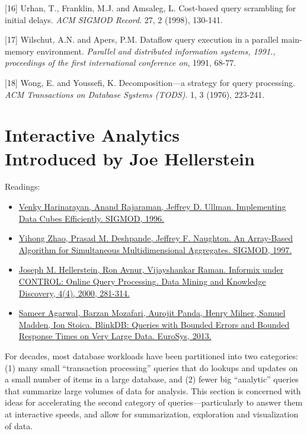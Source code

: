 \documentclass[b5paper,11pt,twoside,openright]{book}
\newcommand\Chapter[3]{
  \hypertarget{#1}{
    \chapter[#2]{#2\\{\Large #3}}
  }
}
\begin{document}
\leavevmode\hypertarget{ref-urhan1998cost}{}%
{[}16{]} Urhan, T., Franklin, M.J. and Amsaleg, L. Cost-based query
scrambling for initial delays. \emph{ACM SIGMOD Record}. 27, 2 (1998),
130-141.

\leavevmode\hypertarget{ref-wilschut1991dataflow}{}%
{[}17{]} Wilschut, A.N. and Apers, P.M. Dataflow query execution in a
parallel main-memory environment. \emph{Parallel and distributed
  information systems, 1991., proceedings of the first international
  conference on}, 1991, 68-77.

\leavevmode\hypertarget{ref-wong1976decomposition}{}%
{[}18{]} Wong, E. and Youssefi, K. Decomposition---a strategy for query
processing. \emph{ACM Transactions on Database Systems (TODS)}. 1, 3
(1976), 223-241.


\Chapter{ch8-interactive}{%
Interactive Analytics
}{%
Introduced by Joe Hellerstein
}

\begin{framed}
Readings:
\begin{itemize}
\item
\href{https://scholar.google.com/scholar?cluster=9112921129698038148}{Venky
  Harinarayan, Anand Rajaraman, Jeffrey D. Ullman. {Implementing Data
    Cubes Efficiently}. {SIGMOD}, 1996.}
\item
\href{https://scholar.google.com/scholar?cluster=1761772586638103323}{Yihong
  Zhao, Prasad M. Deshpande, Jeffrey F. Naughton. {An Array-Based
    Algorithm for Simultaneous Multidimensional Aggregates}. {SIGMOD},
  1997.}
\item
\href{https://scholar.google.com/scholar?cluster=1434575511619007556}{Joseph
  M. Hellerstein, Ron Avnur, Vijayshankar Raman. {Informix under CONTROL:
    Online Query Processing}. {Data Mining and Knowledge Discovery}, 4(4),
  2000, 281-314.}
\item
\href{https://scholar.google.com/scholar?cluster=4916926405792203059}{Sameer
  Agarwal, Barzan Mozafari, Aurojit Panda, Henry Milner, Samuel Madden,
  Ion Stoica. {BlinkDB: Queries with Bounded Errors and Bounded Response
    Times on Very Large Data}. {EuroSys}, 2013.}
\end{itemize}
\end{framed}

For decades, most database workloads have been partitioned into two
categories: (1) many small ``transaction processing'' queries that do
lookups and updates on a small number of items in a large database, and
(2) fewer big ``analytic'' queries that summarize large volumes of data
for analysis. This section is concerned with ideas for accelerating the
second category of queries---particularly to answer them at interactive
speeds, and allow for summarization, exploration and visualization of
data.
\end{document}
